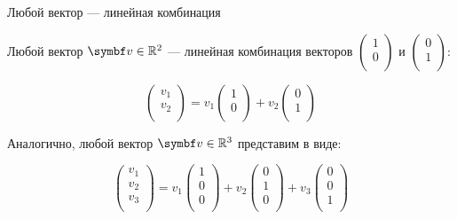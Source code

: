 \begin{frame}{Любой вектор — линейная комбинация}

Любой вектор $\bv \in \R^2$ — линейная комбинация векторов $\begin{pmatrix}
    1 \\
    0 \\
  \end{pmatrix}$ и $\begin{pmatrix}
    0 \\
    1 \\
  \end{pmatrix}$:

\[
\begin{pmatrix}
  v_1 \\
  v_2 \\
\end{pmatrix} = 
v_1 \begin{pmatrix}
    1 \\
    0 \\
  \end{pmatrix} + 
  v_2 \begin{pmatrix}
    0 \\
    1 \\
  \end{pmatrix}
\]

\pause
Аналогично, любой вектор  $\bv \in \R^3$ представим в виде:

\[
\begin{pmatrix}
v_1 \\
v_2 \\
v_3 \\
\end{pmatrix} = 
v_1 \begin{pmatrix}
  1 \\
  0 \\
  0 \\
\end{pmatrix} + 
v_2 \begin{pmatrix}
  0 \\
  1 \\
  0 \\
\end{pmatrix} +
v_3 \begin{pmatrix}
  0 \\
  0 \\
  1 \\
\end{pmatrix} 
\]


  

\end{frame}



